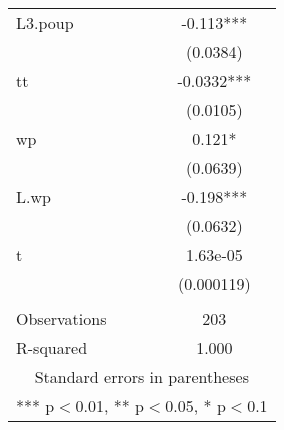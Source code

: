 \begin{tabular}{lc}
L3.poup & -0.113*** \\
 & (0.0384) \\
tt & -0.0332*** \\
 & (0.0105) \\
wp & 0.121* \\
 & (0.0639) \\
L.wp & -0.198*** \\
 & (0.0632) \\
t & 1.63e-05 \\
 & (0.000119) \\
 &  \\
Observations & 203 \\
 R-squared & 1.000 \\ \hline
\multicolumn{2}{c}{ Standard errors in parentheses} \\
\multicolumn{2}{c}{ *** p$<$0.01, ** p$<$0.05, * p$<$0.1} \\
\end{tabular}
